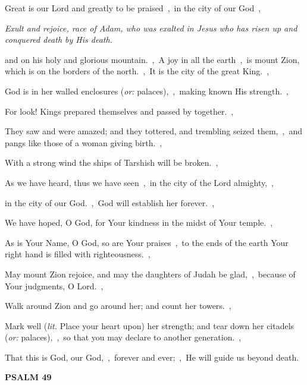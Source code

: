 \documentclass[12pt,twoside,a5paper]{article}
\newcommand{\psalm}[1]{\textbf{PSALM {#1}}\nopagebreak}
\newcommand{\qanona}[1]{{\liturgicalhint{Qanona.} \emph{#1}}}
\newcommand{\translationoption}[1]{\emph{or:} #1}
\newcommand{\translationliteral}[1]{\emph{lit.} #1}
\begin{document}
\begin{normalparskip}
  Great is our Lord and greatly to be praised~\sep\ in the city of our God~\sep

  \qanona{Exult and rejoice, race of Adam, who was exalted in Jesus who has risen up and conquered death by His death.}

  and on his holy and glorious mountain.~\sep\ A joy in all the earth~\sep\ is mount Zion, which is on the borders of the north.~\sep\ It is the city of the great King.~\sep

  God is in her walled enclosures (\translationoption{palaces}),~\sep\ making known His strength.~\sep

  For look! Kings prepared themselves and passed by together.~\sep

  They saw and were amazed; and they tottered, and trembling seized them,~\sep\ and pangs like those of a woman giving birth.~\sep

  With a strong wind the ships of Tarshish will be broken.~\sep

  As we have heard, thus we have seen~\sep\ in the city of the Lord almighty,~\sep

  in the city of our God.~\sep\ God will establish her forever.~\sep

  We have hoped, O God, for Your kindness in the midst of Your temple.~\sep

  As is Your Name, O God, so are Your praises~\sep\ to the ends of the earth Your right hand is filled with righteousness.~\sep

  May mount Zion rejoice, and may the daughters of Judah be glad,~\sep\ because of Your judgments, O Lord.~\sep

  Walk around Zion and go around her; and count her towers.~\sep

  Mark well (\translationliteral{Place your heart upon}) her strength; and tear down her citadels (\translationoption{palaces}),~\sep\ so that you may declare to another generation.~\sep

  That this is God, our God,~\sep\ forever and ever;~\sep\ He will guide us beyond death.
\end{normalparskip}

\psalm{49}
\end{document}

